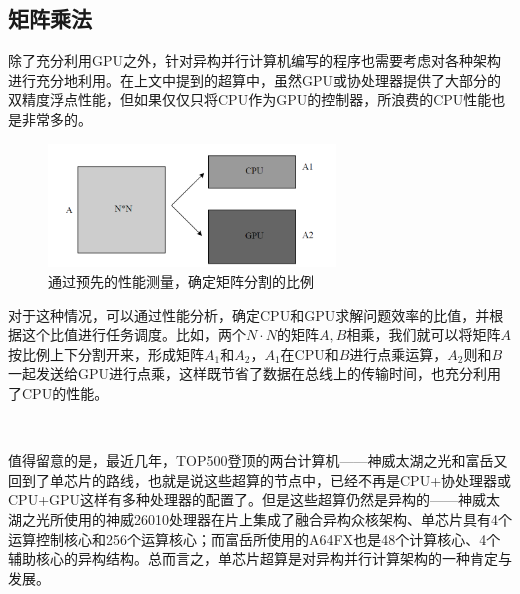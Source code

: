 \documentclass[UTF8,a4paper,10pt]{ctexart}
\begin{document}

\subsection{矩阵乘法}

除了充分利用GPU之外，针对异构并行计算机编写的程序也需要考虑对各种架构进行充分地利用。在上文中提到的超算中，虽然GPU或协处理器提供了大部分的双精度浮点性能，但如果仅仅只将CPU作为GPU的控制器，所浪费的CPU性能也是非常多的。
~
\begin{figure}[!htbp]
    \centering
    \includegraphics[width=3in]{fig/matrix_divide.png}
    \caption{通过预先的性能测量，确定矩阵分割的比例\cite{gpu_martix}}
    \label{fig:matrix_divide}
\end{figure}

对于这种情况，可以通过性能分析，确定CPU和GPU求解问题效率的比值，并根据这个比值进行任务调度。比如，两个$N\cdot N$的矩阵$A, B$相乘，我们就可以将矩阵$A$按比例上下分割开来，形成矩阵$A_{1}$和$A_{2}$，$A_{1}$在CPU和$B$进行点乘运算，$A_{2}$则和$B$一起发送给GPU进行点乘，这样既节省了数据在总线上的传输时间，也充分利用了CPU的性能。\cite{gpu_martix}

~


值得留意的是，最近几年，TOP500登顶的两台计算机——神威太湖之光和富岳又回到了单芯片的路线，也就是说这些超算的节点中，已经不再是CPU+协处理器或CPU+GPU这样有多种处理器的配置了。但是这些超算仍然是异构的——神威太湖之光所使用的神威26010处理器在片上集成了融合异构众核架构、单芯片具有4个运算控制核心和256个运算核心；而富岳所使用的A64FX也是48个计算核心、4个辅助核心的异构结构。总而言之，单芯片超算是对异构并行计算架构的一种肯定与发展。\cite{sw26010}\cite{a64fx}

    


\end{document}
